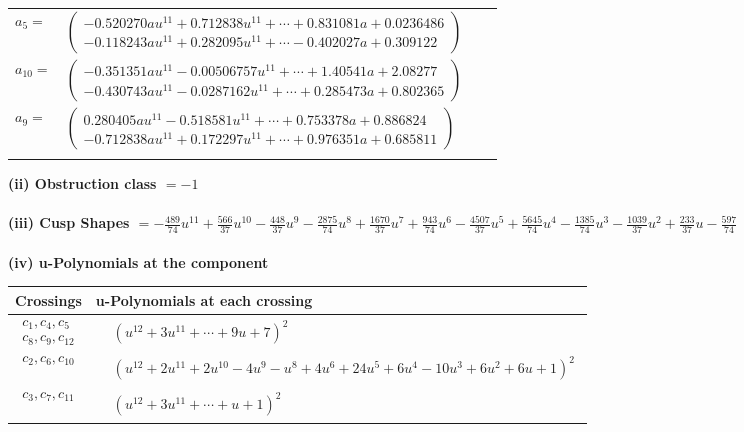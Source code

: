 \documentclass[1p]{elsarticle_modified}
\theoremstyle{definition}
\begin{document}
\begin{tabular}{m{7pt} m{180pt} m{7pt} m{180pt} }
\flushright $a_{5}=$&$\begin{pmatrix}-0.520270 a u^{11}+0.712838 u^{11}+\cdots+0.831081 a+0.0236486\\-0.118243 a u^{11}+0.282095 u^{11}+\cdots-0.402027 a+0.309122\end{pmatrix}$ \\
\flushright $a_{10}=$&$\begin{pmatrix}-0.351351 a u^{11}-0.00506757 u^{11}+\cdots+1.40541 a+2.08277\\-0.430743 a u^{11}-0.0287162 u^{11}+\cdots+0.285473 a+0.802365\end{pmatrix}$ \\
\flushright $a_{9}=$&$\begin{pmatrix}0.280405 a u^{11}-0.518581 u^{11}+\cdots+0.753378 a+0.886824\\-0.712838 a u^{11}+0.172297 u^{11}+\cdots+0.976351 a+0.685811\end{pmatrix}$\\&\end{tabular}
\flushleft \textbf{(ii) Obstruction class $= -1$}\\~\\
\flushleft \textbf{(iii) Cusp Shapes $= -\frac{489}{74} u^{11}+\frac{566}{37} u^{10}-\frac{448}{37} u^9-\frac{2875}{74} u^8+\frac{1670}{37} u^7+\frac{943}{74} u^6-\frac{4507}{37} u^5+\frac{5645}{74} u^4-\frac{1385}{74} u^3-\frac{1039}{37} u^2+\frac{233}{37} u-\frac{597}{74}$}\\~\\
\newpage\renewcommand{\arraystretch}{1}
\flushleft \textbf{(iv) u-Polynomials at the component}\newline \\
\begin{tabular}{m{50pt}|m{274pt}}
Crossings & \hspace{64pt}u-Polynomials at each crossing \\
\hline $$\begin{aligned}c_{1},c_{4},c_{5}\\c_{8},c_{9},c_{12}\end{aligned}$$&$\begin{aligned}
&(u^{12}+3 u^{11}+\cdots+9 u+7)^{2}
\end{aligned}$\\
\hline $$\begin{aligned}c_{2},c_{6},c_{10}\end{aligned}$$&$\begin{aligned}
&(u^{12}+2 u^{11}+2 u^{10}-4 u^9- u^8+4 u^6+24 u^5+6 u^4-10 u^3+6 u^2+6 u+1)^{2}
\end{aligned}$\\
\hline $$\begin{aligned}c_{3},c_{7},c_{11}\end{aligned}$$&$\begin{aligned}
&(u^{12}+3 u^{11}+\cdots+u+1)^{2}
\end{aligned}$\\
\hline
\end{tabular}\\~\\
\end{document}
